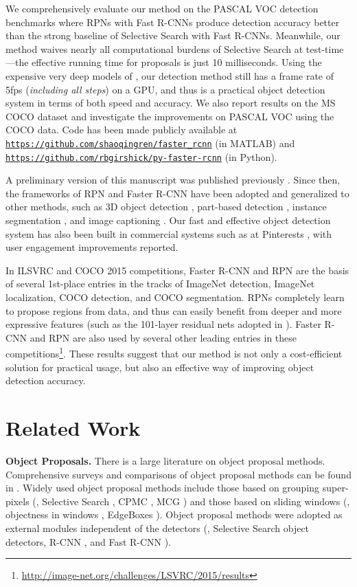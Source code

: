 \documentclass[10pt,journal,cspaper,compsoc]{IEEEtran}
\begin{document}
We comprehensively evaluate our method on the PASCAL VOC detection benchmarks \cite{Everingham2007} where RPNs with Fast R-CNNs produce detection accuracy better than the strong baseline of Selective Search with Fast R-CNNs. Meanwhile, our method waives nearly all computational burdens of Selective Search at test-time---the effective running time for proposals is just 10 milliseconds.
Using the expensive very deep models of \cite{Simonyan2015}, our detection method still has a frame rate of 5fps (\emph{including all steps}) on a GPU, and thus is a practical object detection system in terms of both speed and accuracy.
We also report results on the MS COCO dataset \cite{Lin2014} and investigate the improvements on PASCAL VOC using the COCO data.
Code has been made publicly available at \texttt{\url{https://github.com/shaoqingren/faster_rcnn}} (in MATLAB) and \texttt{\url{https://github.com/rbgirshick/py-faster-rcnn}} (in Python).

A preliminary version of this manuscript was published previously \cite{Ren2015a}. Since then, the frameworks of RPN and Faster R-CNN have been adopted and generalized to other methods, such as 3D object detection \cite{Song2015}, part-based detection \cite{Zhu2015}, instance segmentation \cite{Dai2015a}, and image captioning \cite{Johnson2015}. Our fast and effective object detection system has also been built in commercial systems such as at Pinterests \cite{Kislyuk2015}, with user engagement improvements reported.

In ILSVRC and COCO 2015 competitions, Faster R-CNN and RPN are the basis of several 1st-place entries \cite{He2015a} in the tracks of ImageNet detection, ImageNet localization, COCO detection, and COCO segmentation. RPNs completely learn to propose regions from data, and thus can easily benefit from deeper and more expressive features (such as the 101-layer residual nets adopted in \cite{He2015a}). Faster R-CNN and RPN are also used by several other leading entries in these competitions\footnote{\url{http://image-net.org/challenges/LSVRC/2015/results}}. These results suggest that our method is not only a cost-efficient solution for practical usage, but also an effective way of improving object detection accuracy.


\section{Related Work}

\noindent\textbf{Object Proposals.} There is a large literature on object proposal methods. Comprehensive surveys and comparisons of object proposal methods can be found in \cite{Hosang2014,Hosang2015,Chavali2015}. Widely used object proposal methods include those based on grouping super-pixels (\eg, Selective Search \cite{Uijlings2013}, CPMC \cite{Carreira2012}, MCG \cite{Arbelaez2014}) and those based on sliding windows (\eg, objectness in windows \cite{Alexe2012}, EdgeBoxes \cite{Zitnick2014}). Object proposal methods were adopted as external modules independent of the detectors (\eg, Selective Search \cite{Uijlings2013} object detectors, R-CNN \cite{Girshick2014}, and Fast R-CNN \cite{Girshick2015a}).
\end{document}
